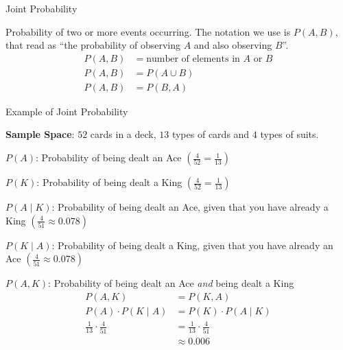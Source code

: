 \begin{frame}{Joint Probability}
	\begin{defn}
		Probability of two or more events occurring. \newline \newline
		The notation we use is $P(A, B)$, that read as
		``the probability of observing $A$ and also observing $B$''. \newline \newline
		$$
			\begin{aligned}
				P(A,B) & = \text{number of elements in $A$ or $B$} \\ P(A,B) & = P(A \cup B) \\ P(A,B) & = P(B,A)
			\end{aligned}
		$$
	\end{defn}
\end{frame}

\begin{frame}{Example of Joint Probability}
	\begin{example}
		\begin{vfilleditems} {\footnotesize \item \textbf{Sample Space}: $52$ cards in a deck, $13$ types of cards and $4$ types of suits.
				\item $P(A)$: Probability of being dealt an Ace $\left( \frac{4}{52} = \frac{1}{13}\right)$
				\item $P(K)$: Probability of being dealt a King $\left( \frac{4}{52} = \frac{1}{13} \right)$
				\item $P(A \mid K)$: Probability of being dealt an Ace, given that you have already a King $\left( \frac{4}{51} \approx 0.078 \right)$
				\item $P(K \mid A)$: Probability of being dealt a King, given that you have already an Ace $\left( \frac{4}{51} \approx 0.078 \right)$
			}
			\item $P(A, K)$: Probability of being dealt an Ace \textit{and} being dealt a King
			$$
				\begin{aligned}
					P(A, K) & = P(K, A) \\ P(A) \cdot P(K \mid A) & = P(K) \cdot P(A \mid K) \\ \frac{1}{13} \cdot \frac{4}{51} & = \frac{1}{13} \cdot \frac{4}{51} \\  & \approx 0.006
				\end{aligned}
			$$
		\end{vfilleditems}
	\end{example}
\end{frame}

